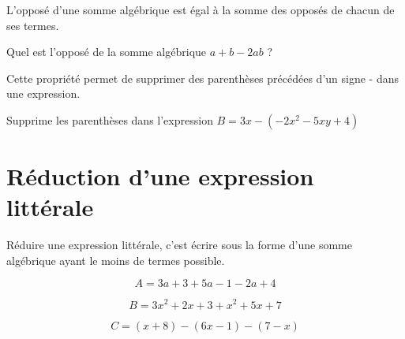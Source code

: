 \documentclass[a4paper,10pt]{report}
\begin{document}
\begin{prop}
L'opposé d'une somme algébrique est égal à la somme des opposés de chacun de ses termes.
\end{prop}

\begin{ex}
Quel est l'opposé de la somme algébrique $a+b-2ab$ ?

\noindent\grandscarreaux{\linewidth}{2.4cm}
\end{ex}

\begin{rem}
Cette propriété permet de supprimer des parenthèses précédées d'un signe \og - \fg{} dans une expression.
\end{rem}

\begin{ex}

\vspace{-5mm} \hspace{3cm} Supprime les parenthèses dans l'expression $B=3x-(-2x^2-5xy+4)$

\vspace{1mm}
\noindent\grandscarreaux{\linewidth}{2.4cm}
\end{ex}

\vspace{-3mm}
\section{Réduction d'une expression littérale}

\begin{defn}
Réduire une expression littérale, c'est écrire sous la forme d'une somme algébrique ayant le moins de termes possible.
\end{defn}

\begin{meth}

\vspace{-3mm}
\noindent \begin{minipage}{5cm}
$$A = 3a + 3 + 5a - 1 - 2a + 4$$

\noindent\grandscarreaux{\linewidth}{3.2cm}
\end{minipage}
\hspace{5mm}
\begin{minipage}{5cm}
$$B = 3x^2 + 2x + 3 + x^2 + 5x + 7$$

\noindent\grandscarreaux{\linewidth}{3.2cm}
\end{minipage}
\hspace{5mm}
\begin{minipage}{5cm}
$$C = (x+8) - (6x-1) - (7-x)$$

\noindent\grandscarreaux{\linewidth}{3.2cm}
\end{minipage}
\end{meth}
\end{document}

